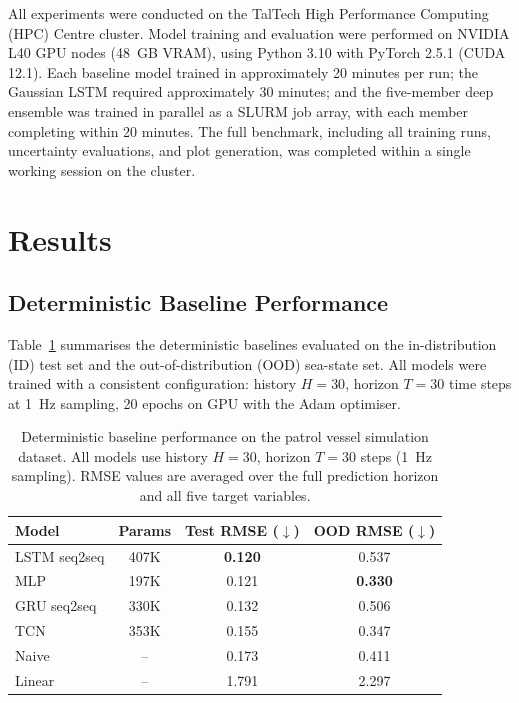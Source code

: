 \documentclass[a4paper,fleqn]{cas-sc}
\begin{document}
All experiments were conducted on the TalTech High Performance Computing (HPC) Centre cluster. Model training and evaluation were performed on NVIDIA L40 GPU nodes (48~GB VRAM), using Python 3.10 with PyTorch 2.5.1 (CUDA 12.1). Each baseline model trained in approximately 20 minutes per run; the Gaussian LSTM required approximately 30 minutes; and the five-member deep ensemble was trained in parallel as a SLURM job array, with each member completing within 20 minutes. The full benchmark, including all training runs, uncertainty evaluations, and plot generation, was completed within a single working session on the cluster.


\section{Results}

\subsection{Deterministic Baseline Performance}

Table~\ref{tab:baseline-rmse} summarises the deterministic baselines evaluated on the in-distribution (ID) test set and the out-of-distribution (OOD) sea-state set. All models were trained with a consistent configuration: history $H=30$, horizon $T=30$ time steps at 1~Hz sampling, 20 epochs on GPU with the Adam optimiser.

\begin{table}[t]
    \centering
    \caption{Deterministic baseline performance on the patrol vessel simulation dataset. All models use history $H=30$, horizon $T=30$ steps (1~Hz sampling). RMSE values are averaged over the full prediction horizon and all five target variables.}
    \label{tab:baseline-rmse}
    \begin{tabular}{lccc}
        \toprule
        \textbf{Model} & \textbf{Params} & \textbf{Test RMSE ($\downarrow$)} & \textbf{OOD RMSE ($\downarrow$)} \\
        \midrule
        LSTM seq2seq  & 407K & \textbf{0.120} & 0.537 \\
        MLP           & 197K & 0.121          & \textbf{0.330} \\
        GRU seq2seq   & 330K & 0.132          & 0.506 \\
        TCN           & 353K & 0.155          & 0.347 \\
        Naive         & --   & 0.173          & 0.411 \\
        Linear        & --   & 1.791          & 2.297 \\
        \bottomrule
    \end{tabular}
\end{table}
\end{document}
